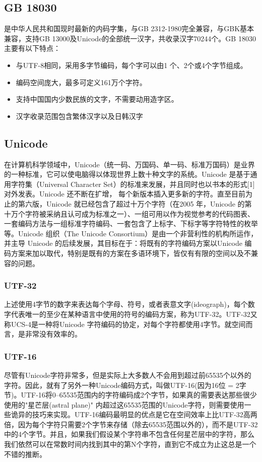 \documentclass{article}
\begin{document}
    \subsection{GB 18030}
        是中华人民共和国现时最新的内码字集，与GB 2312-1980完全兼容，与GBK基本兼容，支持GB 13000及Unicode的全部统一汉字，共收录汉字70244个。GB 18030主要有以下特点：
        \begin{itemize}
            \item 与UTF-8相同，采用多字节编码，每个字可以由1 个、2个或4个字节组成。
            \item 编码空间庞大，最多可定义161万个字符。
            \item 支持中国国内少数民族的文字，不需要动用造字区。
            \item 汉字收录范围包含繁体汉字以及日韩汉字
        \end{itemize}

    \subsection{Unicode}
        在计算机科学领域中，Unicode（统一码、万国码、单一码、标准万国码）是业界的一种标准，它可以使电脑得以体现世界上数十种文字的系统。Unicode 是基于通用字符集（Universal Character Set）的标准来发展，并且同时也以书本的形式[1]对外发表。Unicode 还不断在扩增， 每个新版本插入更多新的字符。直至目前为止的第六版，Unicode 就已经包含了超过十万个字符（在2005 年，Unicode 的第十万个字符被采纳且认可成为标准之一）、一组可用以作为视觉参考的代码图表、一套编码方法与一组标准字符编码、一套包含了上标字、下标字等字符特性的枚举等。Unicode 组织（The Unicode Consortium）是由一个非营利性的机构所运作，并主导 Unicode 的后续发展，其目标在于：将既有的字符编码方案以Unicode 编码方案来加以取代，特别是既有的方案在多语环境下，皆仅有有限的空间以及不兼容的问题。

    \subsubsection{UTF-32}
        上述使用4字节的数字来表达每个字母、符号，或者表意文字(ideograph)，每个数字代表唯一的至少在某种语言中使用的符号的编码方案，称为UTF-32。UTF-32又称UCS-4是一种将Unicode 字符编码的协定，对每个字符都使用4字节。就空间而言，是非常没有效率的。

    \subsubsection{UTF-16}
        尽管有Unicode字符非常多，但是实际上大多数人不会用到超过前65535个以外的字符。因此，就有了另外一种Unicode编码方式，叫做UTF-16(因为16位 = 2字节)。UTF-16将0–65535范围内的字符编码成2个字节，如果真的需要表达那些很少使用的"星芒层(astral plane)" 内超过这65535范围的Unicode字符，则需要使用一些诡异的技巧来实现。UTF-16编码最明显的优点是它在空间效率上比UTF-32高两倍，因为每个字符只需要2个字节来存储（除去65535范围以外的），而不是UTF-32中的4个字节。并且，如果我们假设某个字符串不包含任何星芒层中的字符，那么我们依然可以在常数时间内找到其中的第N个字符，直到它不成立为止这总是一个不错的推断。
\end{document}
